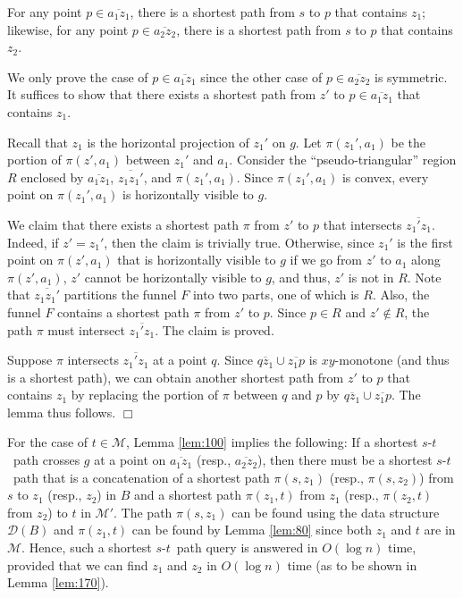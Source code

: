 \documentclass[english,runningheads,11pt]{llncs}
\def\calM{\mathcal{M}}
\def\calD{\mathcal{D}}
\def\st{$s$-$t$}
\newenvironment{proof}{\noindent {\textbf{Proof:}}\rm}{\hfill $\Box$\rm}
\begin{document}
\begin{lemma}\label{lem:100}
For any point $p\in
\overline{a_1z_1}$, there is a shortest path from $s$ to $p$ that
contains $z_1$; likewise,
for any point $p\in \overline{a_2z_2}$, there is a shortest
path from $s$ to $p$ that contains $z_2$.
\end{lemma}
\begin{proof}
We only prove the case of $p\in \overline{a_1z_1}$ since the other case of
$p\in \overline{a_2z_2}$ is symmetric. It suffices to show that there exists a shortest
path from $z'$ to $p\in \overline{a_1z_1}$ that contains $z_1$.

Recall that $z_1$ is the horizontal projection of $z_1'$ on $g$. Let $\pi(z_1',a_1)$ be the portion of $\pi(z',a_1)$ between $z_1'$ and $a_1$.
Consider the ``pseudo-triangular'' region $R$ enclosed by $\overline{a_1z_1}$,
$\overline{z_1z_1'}$, and $\pi(z_1',a_1)$. Since $\pi(z_1',a_1)$ is convex, every point on
$\pi(z_1',a_1)$ is horizontally visible to $g$.

We claim that there exists a shortest path $\pi$ from $z'$ to $p$ that intersects $\overline{z_1'z_1}$. Indeed, if $z'=z_1'$, then the claim is trivially true. Otherwise, since $z_1'$ is the first point on $\pi(z',a_1)$ that is horizontally visible to $g$ if we go from $z'$ to $a_1$ along $\pi(z',a_1)$, $z'$ cannot be horizontally visible to $g$, and thus, $z'$ is not in $R$. Note that $\overline{z_1z_1'}$ partitions the funnel $F$ into two parts, one of which is $R$. Also,
the funnel $F$ contains a shortest path $\pi$ from $z'$ to $p$. Since $p\in R$ and $z'\not\in R$, the path $\pi$ must intersect $\overline{z_1'z_1}$. The claim is proved.

Suppose $\pi$ intersects $\overline{z_1'z_1}$ at a point $q$. Since $\overline{qz_1}\cup \overline{z_1p}$ is $xy$-monotone (and thus is a shortest path), we can obtain another shortest path from $z'$ to $p$ that contains $z_1$ by replacing the portion of $\pi$ between $q$ and $p$ by $\overline{qz_1}\cup \overline{z_1p}$. The lemma thus follows.
\end{proof}

For the case of $t\in \calM$,
Lemma \ref{lem:100} implies the following: If a shortest \st\ path
crosses $g$ at a point on $\overline{a_1z_1}$ (resp.,
$\overline{a_2z_2}$), then there must be a shortest \st\ path that is a
concatenation of a shortest path $\pi(s,z_1)$ (resp., $\pi(s,z_2)$) from $s$ to $z_1$ (resp., $z_2$) in
$B$ and a shortest path $\pi(z_1,t)$ from $z_1$ (resp., $\pi(z_2,t)$ from $z_2$) to $t$ in $\calM'$.
The path $\pi(s,z_1)$ can be found using the data structure $\calD(B)$
and $\pi(z_1,t)$ can be found by Lemma \ref{lem:80} since both $z_1$ and $t$ are in $\calM$.
Hence, such a shortest \st\ path query is answered in $O(\log n)$ time, provided that
we can find $z_1$ and $z_2$ in $O(\log n)$ time (as to be shown in Lemma \ref{lem:170}).
\end{document}
